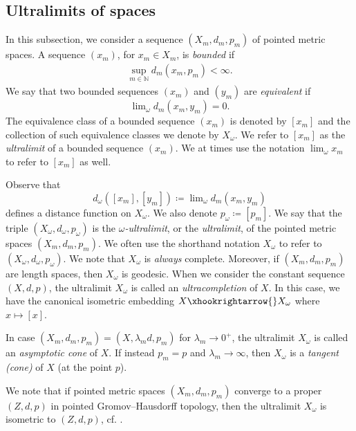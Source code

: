 \documentclass[a4paper,leqno]{amsart}
\numberwithin{equation}{section}
\theoremstyle{remark}
\theoremstyle{remark}
\begin{document}
\subsection{Ultralimits of spaces}\label{section-ultralimits-of-spaces}
In this subsection, we consider a sequence $( X_m, d_m, p_m )$ of pointed metric spaces. A sequence $(x_m)$, for $x_m \in X_m$, is \emph{bounded} if
\begin{align*}
    \sup_{ m \in \mathbb{N} } d_m( x_m, p_m ) < \infty.
\end{align*}
We say that two bounded sequences $(x_m)$ and $(y_m)$ are \emph{equivalent} if
\begin{equation*}
    \lim\nolimits_{\omega} d_m( x_m, y_m ) = 0.
\end{equation*}
The equivalence class of a bounded sequence $(x_m)$ is denoted by $[ x_m ]$ and the collection of such equivalence classes we denote by $X_\omega$. We refer to $[x_m]$ as the \emph{ultralimit} of a bounded sequence $( x_m )$. We at times use the notation $\lim\nolimits_{\omega} x_m$ to refer to $[x_m]$ as well.

Observe that
\begin{equation*}
    d_\omega( [ x_m ], [ y_m ] )
    \coloneqq
    \lim\nolimits_{\omega} d_{m}( x_m, y_m )
\end{equation*}
defines a distance function on $X_\omega$. We also denote $p_\omega \coloneqq [ p_m ]$. We say that the triple $( X_\omega, d_\omega, p_\omega )$ is the \emph{$\omega$-ultralimit}, or the \emph{ultralimit}, of the pointed metric spaces $( X_m, d_m, p_m )$. We often use the shorthand notation $X_\omega$ to refer to $( X_\omega, d_\omega, p_\omega )$. We note that $X_\omega$ is \emph{always} complete. Moreover, if $( X_m, d_m, p_m )$ are length spaces, then $X_\omega$ is geodesic. When we consider the constant sequence $( X, d, p )$, the ultralimit $X_\omega$ is called an \emph{ultracompletion} of $X$. In this case, we have the canonical isometric embedding $X \xhookrightarrow{} X_\omega$ where $x \mapsto [x]$.

In case $( X_m, d_m, p_m ) = ( X, \lambda_m d, p_m )$ for $\lambda_m \rightarrow 0^{+}$, the ultralimit $X_\omega$ is called an \emph{asymptotic cone} of $X$. If instead $p_m = p$ and $\lambda_m \rightarrow \infty$, then $X_\omega$ is a \emph{tangent (cone)} of $X$ (at the point $p$).

We note that if pointed metric spaces $( X_m, d_m, p_m )$ converge to a proper $( Z, d, p )$ in pointed Gromov--Hausdorff topology, then the ultralimit $X_\omega$ is isometric to $( Z, d, p )$, cf. \cite[Theorem 5.16]{alexander-kapovitch-petrunin-2024-alexandrov-geometry-foundations}.
%
\end{document}
